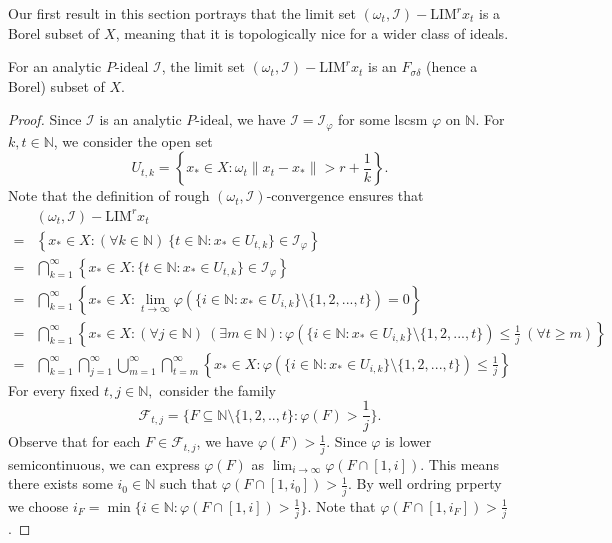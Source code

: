 \documentclass[reqno]{amsart}
\begin{document}
{Our first result in this section portrays that the limit set $(\omega_t,\mathcal{I})-\text{LIM}^r x_t$ is a Borel subset of $X$, meaning that it is topologically nice for a wider class of ideals. 
\begin{proposition} \label{th2.3}
For an analytic $P$-ideal $\mathcal{I}$, the limit set $(\omega_t,\mathcal{I})-\text{LIM}^r x_t$ is an $F_{\sigma\delta}$ (hence a Borel) subset of $X.$ 
\end{proposition}
\begin{proof}
	Since $\mathcal{I}$ is an analytic $P$-ideal, we have $\mathcal{I}=\mathcal{I}_{\varphi}$ for some  lscsm $\varphi$ on $\mathbb{N}$.
	For $k,t\in\mathbb{N}$, we consider the open set $$U_{t,k}=\left\{x_*\in X:\omega_t\|x_t-x_*\|>r+\frac{1}{k}\right\}.$$
	Note that the definition of rough $(\omega_t,\mathcal{I})$-convergence ensures that 
	\begin{align}\label{eq 1a}
		&(\omega_t,\mathcal{I})-\text{LIM}^r x_t\nonumber\\
		=& \left\{x_*\in X: (\forall k\in\mathbb{N})~ \{t\in\mathbb{N}:x_*\in U_{t,k} \}\in\mathcal{I}_{\varphi}\right\}\nonumber\\
		=&\bigcap_{k=1}^{\infty}\left\{x_*\in X:  \{t\in\mathbb{N}:x_*\in U_{t,k} \}\in\mathcal{I}_{\varphi}\right\}\nonumber\\
		=&\bigcap_{k=1}^{\infty}\left\{x_*\in X: \lim_{t\to\infty} \varphi \left(\{i\in\mathbb{N}:x_*\in U_{i,k} \}\setminus\{1,2,...,t\}\right)=0 \right\}\nonumber\\
		=&\bigcap_{k=1}^{\infty}\left\{x_*\in X: (\forall j\in\mathbb{N})~(\exists m\in\mathbb{N}): \varphi(\{i\in\mathbb{N}:x_*\in U_{i,k} \}\setminus\{1,2,...,t\})\leq\frac{1}{j}~(\forall t\geq m) \right\}\nonumber\\
		=&\bigcap_{k=1}^{\infty}\bigcap_{j=1}^{\infty}\bigcup_{m=1}^{\infty}\bigcap_{t=m}^{\infty} \left\{x_*\in X:  \varphi(\{i\in\mathbb{N}:x_*\in U_{i,k} \}\setminus\{1,2,...,t\})\leq\frac{1}{j}\right\}
		\end{align}
	For every fixed $t,j\in\mathbb{N},$ consider the family  $$\mathscr{F}_{t,j}=\{F\subseteq \mathbb{N}\setminus\{1,2,..,t\}: \varphi{(F)}>\frac{1}{j}\}.$$
	Observe that for each \( F \in \mathscr{F}_{t,j} \), we have \( \varphi(F) > \frac{1}{j} \). Since \( \varphi \) is lower semicontinuous, we can express \( \varphi(F) \) as \( \lim_{i \to \infty} \varphi(F \cap [1,i]) \). This means there exists some \( i_0 \in \mathbb{N} \) such that \( \varphi(F \cap [1,i_0]) > \frac{1}{j} \). By well ordring prperty we choose $i_F=\min\{i\in\mathbb{N}: \varphi(F \cap [1,i]) > \frac{1}{j}\}$. Note that $\varphi(F \cap [1,i_F]) > \frac{1}{j}$.

\end{proof}}
\end{document}
